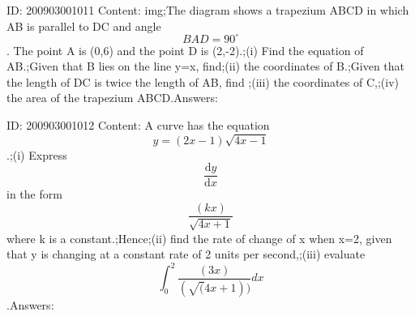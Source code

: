 \documentclass{article}
\begin{document}
ID: 200903001011
Content:
img;The diagram shows a trapezium ABCD in which AB is parallel to DC and angle $$BAD=90^{\circ}$$. The point A is (0,6) and the point D is (2,-2).;(i) Find the equation of AB.;Given that B lies on the line y=x, find;(ii) the coordinates of B.;Given that the length of DC is twice the length of AB, find ;(iii) the coordinates of C,;(iv) the area of the trapezium ABCD.Answers:

ID: 200903001012
Content:
A curve has the equation $$y=(2x-1)\sqrt{4x-1}$$.;(i) Express $$\frac{\mathrm{d}y}{\mathrm{d} x}$$ in the form $$\frac{(kx)}{\sqrt{4x+1}}$$ where k is a constant.;Hence;(ii) find the rate of change of x when x=2, given that y is changing at a constant rate of 2 units per second,;(iii) evaluate $$\int_0^2\frac{(3x)}{(\sqrt(4x+1))} dx$$.Answers:
\end{document}
